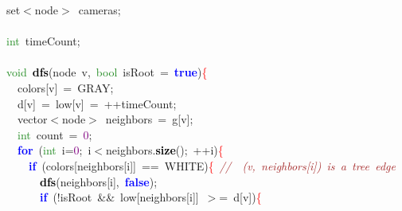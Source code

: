 \mbox{}set\textcolor{BrickRed}{$<$}node\textcolor{BrickRed}{$>$}\ cameras\textcolor{BrickRed}{;} \\
\mbox{} \\
\mbox{}\textcolor{ForestGreen}{int}\ timeCount\textcolor{BrickRed}{;} \\
\mbox{} \\
\mbox{}\textcolor{ForestGreen}{void}\ \textbf{\textcolor{Black}{dfs}}\textcolor{BrickRed}{(}node\ v\textcolor{BrickRed}{,}\ \textcolor{ForestGreen}{bool}\ isRoot\ \textcolor{BrickRed}{=}\ \textbf{\textcolor{Blue}{true}}\textcolor{BrickRed}{)}\textcolor{Red}{\{} \\
\mbox{}\ \ colors\textcolor{BrickRed}{[}v\textcolor{BrickRed}{]}\ \textcolor{BrickRed}{=}\ GRAY\textcolor{BrickRed}{;} \\
\mbox{}\ \ d\textcolor{BrickRed}{[}v\textcolor{BrickRed}{]}\ \textcolor{BrickRed}{=}\ low\textcolor{BrickRed}{[}v\textcolor{BrickRed}{]}\ \textcolor{BrickRed}{=}\ \textcolor{BrickRed}{++}timeCount\textcolor{BrickRed}{;} \\
\mbox{}\ \ vector\textcolor{BrickRed}{$<$}node\textcolor{BrickRed}{$>$}\ neighbors\ \textcolor{BrickRed}{=}\ g\textcolor{BrickRed}{[}v\textcolor{BrickRed}{];} \\
\mbox{}\ \ \textcolor{ForestGreen}{int}\ count\ \textcolor{BrickRed}{=}\ \textcolor{Purple}{0}\textcolor{BrickRed}{;} \\
\mbox{}\ \ \textbf{\textcolor{Blue}{for}}\ \textcolor{BrickRed}{(}\textcolor{ForestGreen}{int}\ i\textcolor{BrickRed}{=}\textcolor{Purple}{0}\textcolor{BrickRed}{;}\ i\textcolor{BrickRed}{$<$}neighbors\textcolor{BrickRed}{.}\textbf{\textcolor{Black}{size}}\textcolor{BrickRed}{();}\ \textcolor{BrickRed}{++}i\textcolor{BrickRed}{)}\textcolor{Red}{\{} \\
\mbox{}\ \ \ \ \textbf{\textcolor{Blue}{if}}\ \textcolor{BrickRed}{(}colors\textcolor{BrickRed}{[}neighbors\textcolor{BrickRed}{[}i\textcolor{BrickRed}{]]}\ \textcolor{BrickRed}{==}\ WHITE\textcolor{BrickRed}{)}\textcolor{Red}{\{}\ \textit{\textcolor{Brown}{//\ \ (v,\ neighbors[i])\ is\ a\ tree\ edge}} \\
\mbox{}\ \ \ \ \ \ \textbf{\textcolor{Black}{dfs}}\textcolor{BrickRed}{(}neighbors\textcolor{BrickRed}{[}i\textcolor{BrickRed}{],}\ \textbf{\textcolor{Blue}{false}}\textcolor{BrickRed}{);} \\
\mbox{}\ \ \ \ \ \ \textbf{\textcolor{Blue}{if}}\ \textcolor{BrickRed}{(!}isRoot\ \textcolor{BrickRed}{\&\&}\ low\textcolor{BrickRed}{[}neighbors\textcolor{BrickRed}{[}i\textcolor{BrickRed}{]]}\ \textcolor{BrickRed}{$>$=}\ d\textcolor{BrickRed}{[}v\textcolor{BrickRed}{])}\textcolor{Red}{\{} \\
